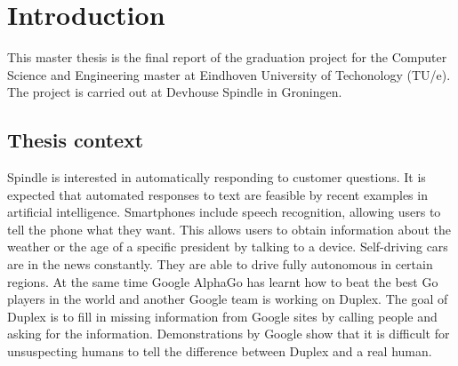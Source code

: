 \chapter{Introduction}
\label{ch:introduction}

\setcounter{page}{0}
This master thesis is the final report of the graduation project for the Computer Science and Engineering master at Eindhoven University of Techonology (TU/e).
The project is carried out at Devhouse Spindle in Groningen.

\section{Thesis context}
\label{sec:thesis_context}
Spindle is interested in automatically responding to customer questions.
It is expected that automated responses to text are feasible by recent examples in artificial intelligence.
Smartphones include speech recognition, allowing users to tell the phone what they want.
This allows users to obtain information about the weather or the age of a specific president by talking to a device.
Self-driving cars are in the news constantly.
They are able to drive fully autonomous in certain regions.
At the same time Google AlphaGo has learnt how to beat the best Go players in the world and another Google team is working on Duplex.
The goal of Duplex is to fill in missing information from Google sites by calling people and asking for the information.
Demonstrations by Google show that it is difficult for unsuspecting humans to tell the difference between Duplex and a real human.

\iffalse
Remarkable about the context is the speed in which the field evolves.
Learning about some scientific topic means picking up a recent book or review paper.

For example, Stanford provides a `Deep Learning for Natural Language Processing' course.
This course is given bij Christopher Manning who has been active in natural language processing for many years and is highly cited in the field.
When comparing the material of the `Winter 2018' version with the `Winter 2017' we see many changes.
Attention and transformer models~\citep{vaswani2017attention} now get three lectures instead of one.
This could be a coincidence where last year has been a particularly interesting one.

Looking at the years before it does not seem to be so.
A recent review paper for the same field~\citep{young2018recent} still see lots of potential.
They expect better models for unlabelled data, reinforcement learning, zero-shot learning and network memory enrichment via knowledge base.
\fi

